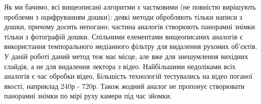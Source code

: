 \chapterConclusion

Як ми бачимо, всі вищеописані алгоритми є частковими (не повністю вирішують проблеми
з оцифруванням дошки): деякі методи обробляють тільки написи з дошки, 
причому досить непогано; частина аналогів створюють панорамні знімки тільки з фотографій дошки.
Спільними елементами вищеописаних аналогів є використання 
темпорального медіанного фільтру для видалення рухомих об'єктів.
У даній роботі даний метод теж має місце, але вже для знешумлення
вихідних слайдів, а не для видалення лектора з відео.
Найбільшими недоліками всіх аналогів є час обробки відео. Більшість технологій
тестувались на відео поганої якості, наприклад 240р - 720р. 
Також жодний аналог не пропонує створювати панорамні знімки по мірі руху камери під
час зйомки.